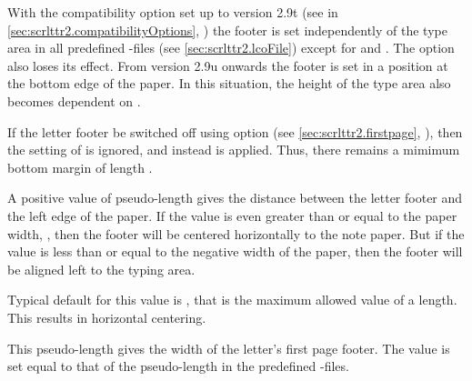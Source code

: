 With the compatibility option
set up to version
2.9t (see
 in
\autoref{sec:scrlttr2.compatibilityOptions},
) the footer is set independently of
the type area in all predefined
-files
(see \autoref{sec:scrlttr2.lcoFile}) except for  and
. The option
 also loses its
effect. From version 2.9u onwards the
footer is set in a position at the bottom edge of the paper. In this
situation, the height of the type area also becomes dependent on
.

If the letter footer be switched off using option
%
(see \autoref{sec:scrlttr2.firstpage},
), then the setting of
 is ignored, and instead
 is applied.  Thus, there remains
a mimimum bottom margin of length .%
%
\EndIndexGroup


\begin{Declaration}
\end{Declaration}
%
A positive value of pseudo-length 
gives the distance between the letter footer and the left edge of the
paper. If the value is even greater than or equal to the paper width,
, then the footer will be centered
horizontally to the note paper. But if the value is less than or equal to the
negative width of the paper, then the footer will be aligned left to the
typing area.

Typical default for this value is ,
that is the maximum allowed value of a length. This results in horizontal
centering.%
\EndIndexGroup


\begin{Declaration}
\end{Declaration}
This pseudo-length gives the width of the letter's first page footer. The
value is set equal to that of the pseudo-length
%
 in the predefined
-files.%
%
\EndIndexGroup
%
\EndIndexGroup
%
\EndIndexGroup


